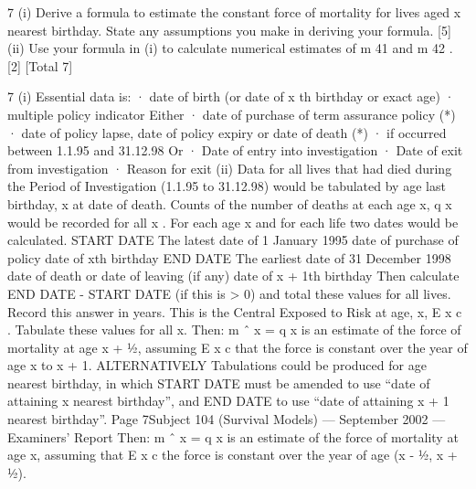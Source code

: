 \documentclass[a4paper,12pt]{article}
\begin{document}
7
(i) Derive a formula to estimate the constant force of mortality for lives aged x
nearest birthday. State any assumptions you make in deriving your formula.
[5]
(ii) Use your formula in (i) to calculate numerical estimates of m 41 and m 42 .
[2]
[Total 7]


7
(i) Essential data is:
· date of birth (or date of x th birthday or exact age)
· multiple policy indicator
Either
· date of purchase of term assurance policy (*)
· date of policy lapse, date of policy expiry or date of death (*)
· if occurred between 1.1.95 and 31.12.98
Or
· Date of entry into investigation
· Date of exit from investigation
· Reason for exit
(ii) Data for all lives that had died during the Period of Investigation (1.1.95 to
31.12.98) would be tabulated by age last birthday, x at date of death. Counts
of the number of deaths at each age x, q x would be recorded for all x .
For each age x and for each life two dates would be calculated.
START DATE
The latest date of
1 January 1995
date of purchase of policy
date of xth birthday
END DATE
The earliest date of
31 December 1998
date of death or date of leaving (if any)
date of x + 1th birthday
Then calculate END DATE - START DATE (if this is > 0) and total these
values for all lives. Record this answer in years. This is the Central Exposed
to Risk at age, x, E x c .
Tabulate these values for all x.
Then: m ˆ x =
q x
is an estimate of the force of mortality at age x + 1⁄2, assuming
E x c
that the force is constant over the year of age x to x + 1.
ALTERNATIVELY
Tabulations could be produced for age nearest birthday, in which
START DATE must be amended to use “date of attaining x nearest birthday”,
and END DATE to use “date of attaining x + 1 nearest birthday”.
Page 7Subject 104 (Survival Models) — September 2002 — Examiners’ Report
Then: m ˆ x =
q x
is an estimate of the force of mortality at age x, assuming that
E x c
the force is constant over the year of age (x - 1⁄2, x + 1⁄2).
\end{document}

